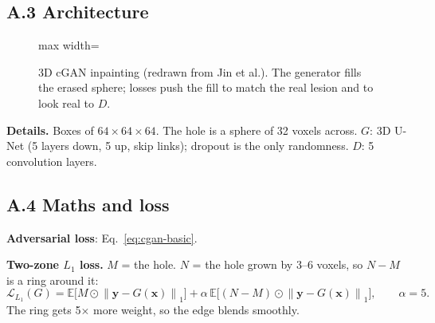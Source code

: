 \documentclass[11pt,a4paper,oneside]{report}
\newcommand{\E}{\mathbb{E}}
\newcommand{\Loss}{\mathcal{L}}
\newcommand{\had}{\odot}
\newcommand{\norm}[1]{\left\lVert #1 \right\rVert}
\begin{document}
\subsection*{A.3 Architecture}
\begin{figure}[H]
\centering
\begin{adjustbox}{max width=\linewidth}
\end{adjustbox}
\caption{3D cGAN inpainting (redrawn from Jin et al.). The generator fills the erased sphere; losses push the fill to match the real lesion and to look real to $D$.}
\end{figure}


\textbf{Details.} Boxes of $64\times64\times64$. The hole is a sphere of 32 voxels across. $G$: 3D U-Net (5 layers down, 5 up, skip links); dropout is the only randomness. $D$: 5 convolution layers.

\subsection*{A.4 Maths and loss}
\textbf{Adversarial loss}: Eq.~\eqref{eq:cgan-basic}.

\textbf{Two-zone $L_1$ loss.} $M$ = the hole. $N$ = the hole grown by 3--6 voxels, so $N-M$ is a ring around it:
\begin{equation}
\Loss_{L_1}(G) = \E\Big[M\had\norm{\bm y-G(\bm x)}_1\Big] + \alpha\,\E\Big[(N-M)\had\norm{\bm y-G(\bm x)}_1\Big],\qquad \alpha=5.
\end{equation}
The ring gets 5$\times$ more weight, so the edge blends smoothly.
\end{document}
